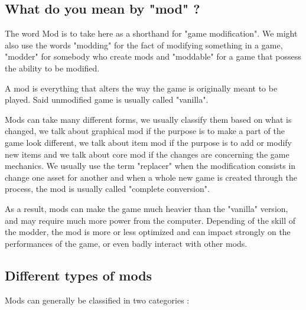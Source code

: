 \documentclass[a4paper,12pt]{article}
\begin{document}
\subsection{What do you mean by "mod" ?}

The word Mod is to take here as a shorthand for "game modification". We might also use the words "modding" for the fact of modifying something in a game, "modder" for somebody who create mods and "moddable" for a game that possess the ability to be modified.

A mod is everything that alters the way the game is originally meant to be played. Said unmodified game is usually called "vanilla".

Mods can take many different forms, we usually classify them based on what is changed, we talk about graphical mod if the purpose is to make a part of the game look different, we talk about item mod if the purpose is to add or modify new items and we talk about core mod if the changes are concerning the game mechanics. We usually use the term "replacer" when the modification consists in change one asset for another and when a whole new game is created through the process, the mod is usually called "complete conversion".

As a result, mods can make the game much heavier than the "vanilla" version, and may require much more power from the computer. Depending of the skill of the modder, the mod is more or less optimized and can impact strongly on the performances of the game, or even badly interact with other mods.

\subsection{Different types of mods}

Mods can generally be classified in two categories :
\end{document}
